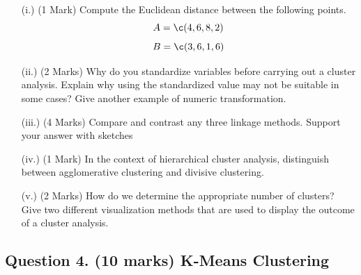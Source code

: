 \documentclass[a4paper,12pt]{article}
\begin{document}
\begin{itemize}
		\item[(i.)](1 Mark)  Compute the Euclidean distance between the following points.
		\[ A = \c(4,6,8,2)\]
		\[ B = \c(3,6,1,6)\]
%		
	
	
	\item[(ii.)](2 Marks) Why do you standardize variables before carrying out a cluster analysis.
		Explain why using the standardized value may not be suitable in some cases? Give another example of numeric transformation. 
	
	\item[(iii.)](4 Marks)  Compare and contrast any three linkage methods. Support your answer with sketches
	
	\item[(iv.)](1 Mark)  In the context of hierarchical cluster analysis, distinguish between agglomerative clustering and divisive clustering.

	
	
	\item[(v.)](2 Marks)  How do we determine the appropriate number of clusters?  Give two different visualization methods that are used to display the outcome of a cluster analysis.
	
%	


	
\end{itemize}



\newpage

\subsection*{Question 4. (10 marks) K-Means Clustering}
\end{document}
